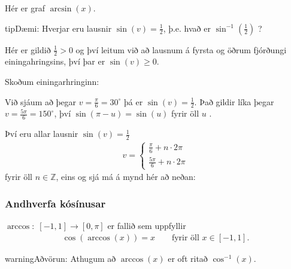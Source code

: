 \documentclass[a4paper,10pt,icelandic]{sphinxmanual}
\begin{document}

Hér er graf \(\arcsin(x)\).

\begin{sphinxadmonition}{tip}{Dæmi:}
Hverjar eru lausnir \(\sin(v)=\frac12\), þ.e. hvað er \(\sin^{-1} \left(\frac12 \right)\) ?

Hér er gildið \(\frac12 >0\) og því leitum við að lausnum á fyrsta og öðrum fjórðungi einingahringsins, því þar er \(\sin(v)\geq 0\).

Skoðum einingarhringinn:

\begin{figure}[H]
\centering

\noindent{}
\end{figure}

Við sjáum að þegar \(v=\frac{\pi}{6}=30^\circ\) þá er \(\sin(v) = \frac12\). Það gildir líka þegar \(v=\frac{5\pi}{6} = 150^\circ\), því \(\sin(\pi-u) = \sin(u)\) fyrir öll \(u\) .

Því eru allar lausnir \(\sin(v)=\frac12\)
\begin{equation*}
\begin{split}v =
\begin{cases}
\frac{\pi}{6} + n\cdot 2\pi \\
\frac{5\pi}{6} + n \cdot 2\pi
\end{cases}\end{split}
\end{equation*}
fyrir öll \(n \in \mathbb{Z}\), eins og sjá má á mynd hér að neðan:

\end{sphinxadmonition}


\subsubsection{Andhverfa kósínusar}
\label{\detokenize{Kafli07:andhverfa-kosinusar}}
\(\arccos: \; [-1,1] \rightarrow [0, \pi]\) er fallið sem uppfyllir
\begin{equation*}
\begin{split}\cos(\arccos(x)) = x \qquad \text{fyrir öll  } x \in [−1, 1].\end{split}
\end{equation*}
\begin{sphinxadmonition}{warning}{Aðvörun:}
Athugum að \(\arccos(x)\) er oft ritað \(\cos^{-1}(x)\).
\end{sphinxadmonition}
\end{document}
